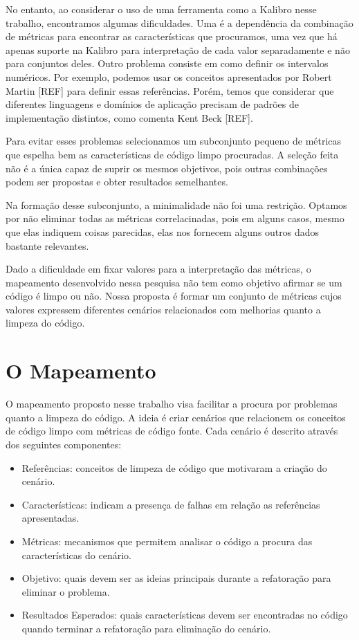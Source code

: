 	No entanto, ao considerar o uso de uma ferramenta como a Kalibro nesse trabalho, encontramos algumas dificuldades. Uma é a dependência da combinação de métricas para encontrar as características que procuramos, uma vez que há apenas suporte na Kalibro para interpretação de cada valor separadamente e não para conjuntos deles. Outro problema consiste em como definir os intervalos numéricos. Por exemplo, podemos usar os conceitos apresentados por Robert Martin [REF] para definir essas referências. Porém, temos que considerar que diferentes linguagens e domínios de aplicação precisam de padrões de implementação distintos, como comenta Kent Beck [REF].	
	
	Para evitar esses problemas selecionamos um subconjunto pequeno de métricas que espelha bem as características de código limpo procuradas. A seleção feita não é a única capaz de suprir os mesmos objetivos, pois outras combinações podem ser propostas e obter resultados semelhantes.
		
	Na formação desse subconjunto, a minimalidade não foi uma restrição. Optamos por não eliminar todas as métricas correlacinadas, pois em alguns casos, mesmo que elas indiquem coisas parecidas, elas nos fornecem alguns outros dados bastante relevantes.
	
	Dado a dificuldade em fixar valores para a interpretação das métricas, o mapeamento desenvolvido nessa pesquisa não tem como objetivo afirmar se um código é limpo ou não. Nossa proposta é formar um conjunto de métricas cujos valores expressem diferentes cenários relacionados com melhorias quanto a limpeza do código.
	
	
\section{O Mapeamento}

	O mapeamento proposto nesse trabalho visa facilitar a procura por problemas quanto a limpeza do código. A ideia é criar cenários que relacionem os conceitos de código limpo com métricas de código fonte. Cada cenário é descrito através dos seguintes componentes:
	
\begin{itemize}
	\item Referências: conceitos de limpeza de código que motivaram a criação do cenário.
	\item Características: indicam a presença de falhas em relação as referências apresentadas.
	\item Métricas: mecanismos que permitem analisar o código a procura das características do cenário.
	\item Objetivo: quais devem ser as ideias principais durante a refatoração para eliminar o problema.
	\item Resultados Esperados: quais características devem ser encontradas no código quando terminar a refatoração para eliminação do cenário.
\end{itemize}	

